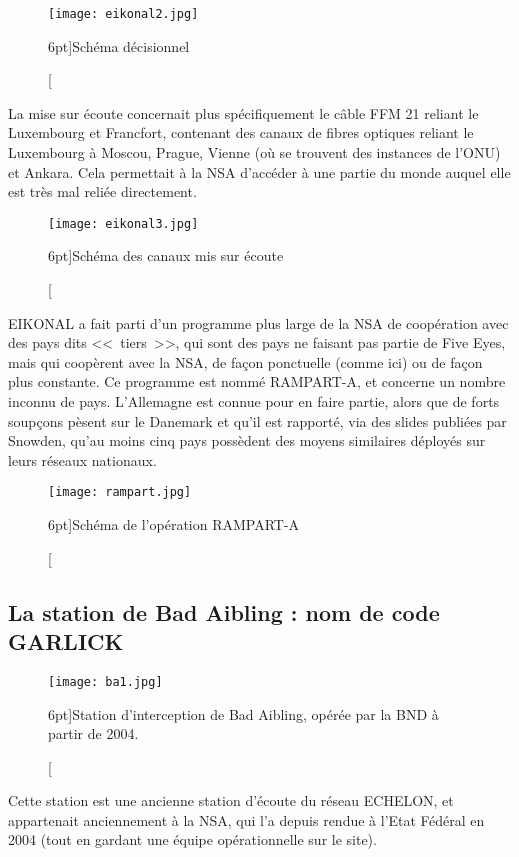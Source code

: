 \begin{figure}
\texttt{[image: eikonal2.jpg]}
\caption[Schéma décisionnel de l'opération EIKONAL][6pt]{Schéma décisionnel}
\label{fig:eikonal2}
\end{figure}

La mise sur écoute concernait plus spécifiquement le câble FFM 21
reliant le Luxembourg et Francfort, contenant des canaux de fibres optiques
reliant le Luxembourg à Moscou, Prague, Vienne (où se trouvent des instances de
l'ONU) et Ankara\citep{eikonal3}. Cela permettait à la NSA d'accéder à une
partie du monde auquel elle est très mal reliée directement.

\begin{figure}[!h]
\texttt{[image: eikonal3.jpg]}
\caption[Schéma des canaux mis sur écoute][6pt]{Schéma des canaux mis sur
écoute}
\label{fig:eikonal3}
\end{figure}

\newpage
EIKONAL a fait parti d'un programme plus large de la NSA de
coopération avec des pays dits <<~tiers~>>, qui sont des pays ne faisant pas
partie de Five Eyes, mais qui coopèrent avec la NSA, de façon ponctuelle (comme
ici) ou de façon plus constante. Ce programme est nommé RAMPART-A, et concerne
un nombre inconnu de pays. L'Allemagne est connue pour en faire partie, alors
que de forts soupçons pèsent sur le Danemark\cite{danemark} et qu'il est
rapporté, via des slides publiées par Snowden, qu'au moins cinq pays possèdent
des moyens similaires déployés sur leurs réseaux nationaux.

\begin{figure}
\texttt{[image: rampart.jpg]}
\caption[Schéma de l'opération RAMPART-A][6pt]{Schéma de l'opération RAMPART-A}
\label{fig:rampart}
\end{figure}


\newpage
\subsection{La station de Bad Aibling : nom de code GARLICK}

\begin{figure}
\texttt{[image: ba1.jpg]}
\caption[Station d'interception de Bad Aibling][6pt]{Station d'interception de
Bad Aibling, opérée par la BND à partir de 2004.}
\label{fig:ba1}
\end{figure}

Cette station est une ancienne station d'écoute du réseau ECHELON,
et appartenait anciennement à la NSA, qui l'a depuis rendue à l'Etat Fédéral en
2004 (tout en gardant une équipe opérationnelle sur le site).\cite{spiegel}

